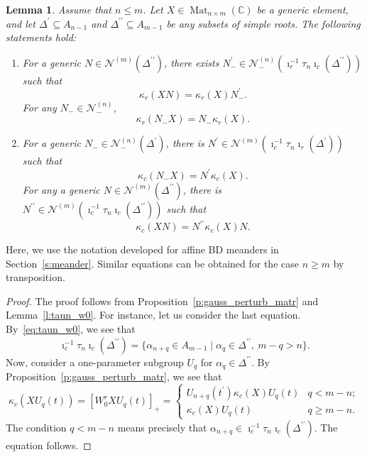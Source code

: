 \documentclass[11pt]{article}
\DeclareMathOperator{\Mat}{Mat}
\newtheorem{lemma}[theorem]{Lemma}%
\theoremstyle{definition}\newtheorem{definition}[theorem]{Definition}
\theoremstyle{definition}\newtheorem{remark}[theorem]{Remark}
\theoremstyle{remark}
\numberwithin{equation}{section}
\begin{document}
\begin{lemma}\label{l:kappa_invar}
    Assume that $n \leq m$. Let $X \in \Mat_{n\times m}(\mathbb{C})$ be a generic element, and let $\Delta^\prime \subseteq A_{n-1}$ and $\Delta^{\prime\prime}\subseteq A_{m-1}$ be any subsets of simple roots. The following statements hold:
    \begin{enumerate}[1)]
        \item For a generic $N \in \mathcal{N}^{(m)}(\Delta^{\prime\prime})$, there exists $N_-^\prime \in \mathcal{N}_-^{(n)}(\imath_r^{-1}\tau_n \imath_c(\Delta^{\prime\prime}))$ such that 
        \begin{equation*}
            \kappa_r(XN) = \kappa_r(X)N_-^\prime.
        \end{equation*}
        For any $N_- \in \mathcal{N}^{(n)}_-$,
        \begin{equation*}
            \kappa_r(N_-X) = N_- \kappa_r(X).
        \end{equation*}
        \item For a generic $N_- \in \mathcal{N}_-^{(n)}(\Delta^\prime)$, there is $N^\prime \in \mathcal{N}^{(m)}(\imath_c^{-1}\tau_n\imath_r(\Delta^\prime))$ such that
        \begin{equation*}
            \kappa_c(N_- X) = N^\prime \kappa_c(X).
        \end{equation*}
        For any a generic $N \in \mathcal{N}^{(m)}(\Delta^{\prime\prime})$, there is $N^{\prime\prime} \in \mathcal{N}^{(m)}(\imath_c^{-1}\tau_n \imath_c(\Delta^{\prime\prime}))$ such that
        \begin{equation*}
            \kappa_c(XN) = N^{\prime\prime} \kappa_c(X)N.
        \end{equation*}
    \end{enumerate}
\end{lemma}
Here, we use the notation developed for affine BD meanders in Section~\ref{s:meander}. Similar equations can be obtained for the case $n \geq m$ by transposition.
\begin{proof}
The proof follows from Proposition~\ref{p:gauss_perturb_matr} and Lemma~\ref{l:taun_w0}. For instance, let us consider the last equation. By~\eqref{eq:taun_w0}, we see that
\begin{equation*}
    \imath_c^{-1}\tau_n\imath_c(\Delta^{\prime\prime}) = \{ \alpha_{n+q} \in A_{m-1} \mid \alpha_q \in \Delta^{\prime\prime}, \ m-q  > n \}.
\end{equation*}
Now, consider a one-parameter subgroup $U_q$ for $\alpha_q\in \Delta^{\prime\prime}$. By Proposition~\ref{p:gauss_perturb_matr}, we see that
\begin{equation*}
    \kappa_c(XU_q(t)) = [W_0^r XU_q(t)]_+ = \begin{cases}
        U_{n+q}(t^\prime)\kappa_c(X) U_q(t) & q < m-n;\\
        \kappa_c(X) U_q(t) & q \geq m-n.
    \end{cases}
\end{equation*}
The condition $q < m-n$ means precisely that $\alpha_{n+q} \in \imath_c^{-1}\tau_n \imath_c(\Delta^{\prime\prime})$. The equation follows.
\end{proof}
\end{document}
